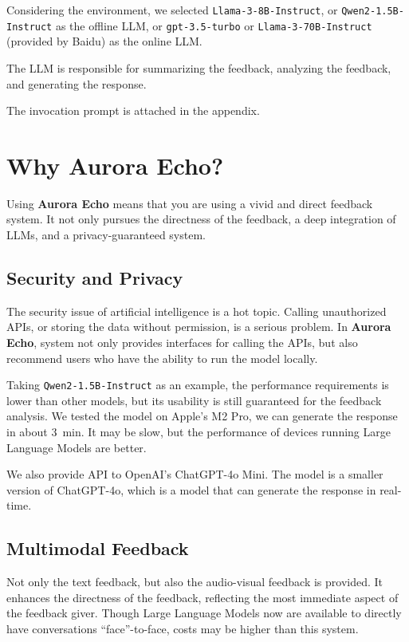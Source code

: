 \documentclass{article}
\begin{document}
    Considering the environment, we selected \texttt{Llama-3-8B-Instruct}\cite{llama3modelcard}, or \texttt{Qwen2-1.5B-Instruct}\cite{qwen2} as the offline LLM, or \texttt{gpt-3.5-turbo}\cite{gpt-3.5-turbo} or \texttt{Llama-3-70B-Instruct} (provided by Baidu)\cite{llama-3-70b-instruct} as the online LLM.

    The LLM is responsible for summarizing the feedback, analyzing the feedback, and generating the response.

    The invocation prompt is attached in the appendix.

    \section{Why Aurora Echo?}\label{sec:why}

    Using \textbf{Aurora Echo} means that you are using a vivid and direct feedback system.
    It not only pursues the directness of the feedback, a deep integration of LLMs, and a privacy-guaranteed system.

    \subsection{Security and Privacy}\label{subsec:security}

    The security issue of artificial intelligence is a hot topic.
    Calling unauthorized APIs, or storing the data without permission, is a serious problem.
    In \textbf{Aurora Echo}, system not only provides interfaces for calling the APIs, but also recommend users who have the ability to run the model locally.

    Taking \texttt{Qwen2-1.5B-Instruct} as an example, the performance requirements is lower than other models, but its usability is still guaranteed for the feedback analysis.
    We tested the model on Apple's M2 Pro, we can generate the response in about \qty{3}{\minute}.
    It may be slow, but the performance of devices running Large Language Models are better.

    We also provide API to OpenAI's ChatGPT-4o Mini.
    The model is a smaller version of ChatGPT-4o, which is a model that can generate the response in real-time.

    \subsection{Multimodal Feedback}\label{subsec:multimodal}

    Not only the text feedback, but also the audio-visual feedback is provided.
    It enhances the directness of the feedback, reflecting the most immediate aspect of the feedback giver.
    Though Large Language Models now are available to directly have conversations ``face''-to-face, costs may be higher than this system.
\end{document}
